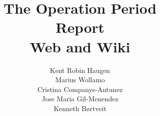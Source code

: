 \documentclass[a4, paper]{article}
\title{The Operation Period \\ Report \\ \vspace{3mm} \Huge{Web and Wiki}}
\author{Kent Robin Haugen \\ Marius Wollamo \\ Cristina Companys-Antunez \\ Jose Maria Gil-Menendez \\ Kenneth Børtveit}
\begin{document}
\maketitle
\pagebreak
\tableofcontents
\pagebreak





\end{document}
